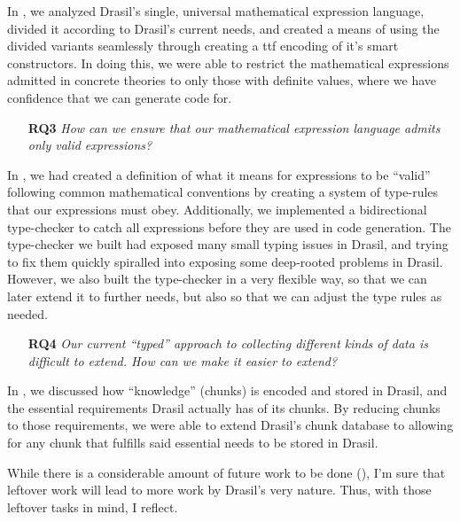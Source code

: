 In , we analyzed Drasil's single, universal
mathematical expression language, divided it according to Drasil's current
needs, and created a means of using the divided variants seamlessly through
creating a \acs{ttf} encoding of it's smart constructors. In doing this, we were
able to restrict the mathematical expressions admitted in concrete theories to
only those with definite values, where we have confidence that we can generate
code for.

\begin{enumerate}

    \item[\textbf{RQ3}] \textit{How can we ensure that our mathematical
          expression language admits only valid expressions?}

\end{enumerate}

In , we had created a definition of what it means for
expressions to be ``valid'' following common mathematical conventions by
creating a system of type-rules that our expressions must obey. Additionally, we
implemented a bidirectional type-checker to catch all expressions before they
are used in code generation. The type-checker we built had exposed many small
typing issues in Drasil, and trying to fix them quickly spiralled into exposing
some deep-rooted problems in Drasil. However, we also built the type-checker in
a very flexible way, so that we can later extend it to further needs, but also
so that we can adjust the type rules as needed.

\begin{enumerate}

    \item[\textbf{RQ4}] \textit{Our current ``typed'' approach to collecting
          different kinds of data is difficult to extend. How can we make it
          easier to extend?}

\end{enumerate}

In , we discussed how ``knowledge'' (chunks) is encoded
and stored in Drasil, and the essential requirements Drasil actually has of its
chunks. By reducing chunks to those requirements, we were able to extend
Drasil's chunk database to allowing for any chunk that fulfills said essential
needs to be stored in Drasil.

While there is a considerable amount of future work to be done
(), I'm sure that leftover work will lead to more work by
Drasil's very nature. Thus, with those leftover tasks in mind, I reflect.

